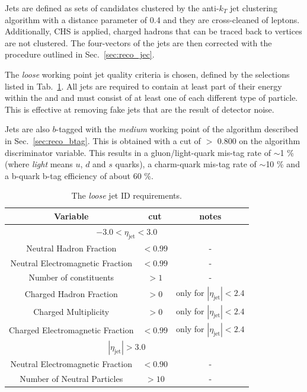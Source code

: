 Jets are defined as sets of \PF candidates clustered by the
anti-$k_{T}$ jet clustering algorithm with a distance parameter of 0.4
and they are cross-cleaned of leptons. Additionally, \ac{CHS} is
applied, charged hadrons that can be traced back to \PU vertices are
not clustered. The four-vectors of the jets are then corrected with
the procedure outlined in Sec.~\ref{sec:reco_jec}.

The \emph{loose} working point jet quality criteria is chosen, defined
by the selections listed in Tab.~\ref{tab:loose-jet-id}. All jets are
required to contain at least part of their energy within the \ECAL and
\HCAL and must consist of at least one of each different type of
particle. This is effective at removing fake jets that are the result
of detector noise.  

Jets are also $b$-tagged with the \emph{medium} working point of the
algorithm described in Sec.~\ref{sec:reco_btag}. This is obtained with
a cut of $>$ 0.800 on the algorithm discriminator variable. This
results in a gluon/light-quark mis-tag rate of $\sim$1 \% (where
\emph{light} means $u$, $d$ and $s$ quarks), a charm-quark mis-tag
rate of $\sim$10 \% and a b-quark b-tag efficiency of about 60 \%. 

\begin{table}[ht!]
  \caption{The \emph{loose} jet ID requirements. \label{tab:loose-jet-id}}
  \centering
  \begin{tabular}{ ccc }
    Variable & cut & notes \\ \hline
    \multicolumn{3}{c}{$-3.0 < \eta_{\mathrm{jet}} < 3.0$} \\ \hline    
    Neutral Hadron Fraction & $<0.99$ & - \\
    Neutral Electromagnetic Fraction & $<0.99$ & - \\
    Number of constituents & $>1$ & - \\
    Charged Hadron Fraction & $>0$ & only for $|\eta_{\mathrm{jet}}| < 2.4$ \\
    Charged Multiplicity & $>0$ & only for $|\eta_{\mathrm{jet}}| < 2.4$ \\
    Charged Electromagnetic Fraction & $<0.99$ & only for $|\eta_{\mathrm{jet}}| < 2.4$ \\ \hline
    \multicolumn{3}{c}{$|\eta_{\mathrm{jet}}| > 3.0$} \\ \hline        
    Neutral Electromagnetic Fraction & $<0.90$ & - \\
    Number of Neutral Particles & $>10$ & - \\
  \end{tabular}
\end{table}

